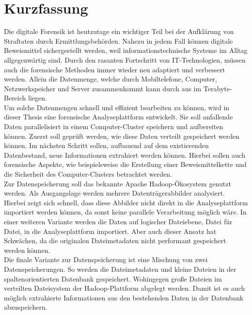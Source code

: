 %
\section*{Kurzfassung}
Die digitale Forensik ist heutzutage ein wichtiger Teil bei der Aufklärung von Straftaten durch Ermittlungsbehörden. Nahezu in jedem Fall können digitale Beweismittel sichergestellt werden, weil informationstechnische Systeme im Alltag allgegenwärtig sind. Durch den rasanten Fortschritt von IT-Technologien, müssen auch die forensische Methoden immer wieder neu adaptiert und verbessert werden. Allein die Datenmenge, welche durch Mobiltelefone, Computer, Netzwerkspeicher und Server zusammenkommt kann durch aus im Terabyte-Bereich liegen.\\

\noindent
Um solche Datenmengen schnell und effizient bearbeiten zu können, wird in dieser Thesis eine forensische Analyseplattform entwickelt. Sie soll anfallende Daten parallelisiert in einem Computer-Cluster speichern und aufbereiten können. Zuerst soll geprüft werden, wie diese Daten verteilt gespeichert werden können. Im nächsten Schritt sollen, aufbauend auf dem existierenden Datenbestand, neue Informationen extrahiert werden können. Hierbei sollen auch forensische Aspekte, wie beispielsweise die Erstellung einer Beweismittelkette und die Sicherheit des Computer-Clusters betrachtet werden.\\

\noindent
Zur Datenspeicherung soll das bekannte Apache Hadoop\textsuperscript{\textregistered}-Ökosystem genutzt werden. Als Ausgangslage werden mehrere Datenträgerabbilder analysiert. Hierbei zeigt sich schnell, dass diese Abbilder nicht direkt in die Analyseplattform importiert werden können, da sonst keine parallele Verarbeitung möglich wäre. In einer weiteren Variante werden die Daten auf logischer Dateiebene, Datei für Datei, in die Analyseplattform importiert. Aber auch dieser Ansatz hat Schwächen, da die originalen Dateimetadaten nicht performant gespeichert werden können.\\
Die finale Variante zur Datenspeicherung ist eine Mischung von zwei Datenspeicherungen. So werden die Dateimetadaten und kleine Dateien in der spaltenorientierten Datenbank gespeichert. Wohingegen große Dateien im verteilten Dateisystem der Hadoop-Plattform abgelegt werden. Damit ist es auch möglich extrahierte Informationen aus den bestehenden Daten in der Datenbank abzuspeichern.\\

